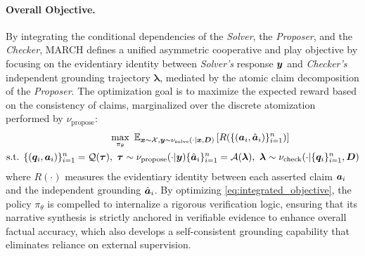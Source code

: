 \documentclass[10pt, a4paper, logo]{googledeepmind} %
\begin{document}
\paragraph{Overall Objective.} By integrating the conditional dependencies of the \textit{Solver},  the \textit{Proposer}, and the \textit{Checker}, MARCH defines a unified {asymmetric cooperative and play objective} by focusing on the {evidentiary identity} between \textit{Solver's} response ${\bm{y}}$ and \textit{Checker's} independent grounding trajectory $\bm{\lambda}$, mediated by the atomic claim decomposition of the \textit{Proposer}. The optimization goal is to maximize the expected reward based on the consistency of claims, marginalized over the discrete atomization performed by $\nu_\text{propose}$:
\begin{align}
   &\max_{\pi_\theta}\ \mathbb{E}_{
   {\bm{x}}\sim{\mathcal{X}}, {\bm{y}} \sim \nu_{\text{solve}} (\cdot|{\bm{x}}, {\bm{D}})} \left[ R(\{({\bm{a}}_i, \hat{{\bm{a}}}_i)\}_{i=1}^n) \right] \label{eq:integrated_objective} \\
\text{s.t. }
   \{({\bm{q}}_i, {\bm{a}}_i)\}_{i=1}^n = {\mathcal{Q}}({\bm{\tau}})&, \ {\bm{\tau}}\sim \nu_{\text{propose}}(\cdot|{\bm{y}}) \{\hat{{\bm{a}}}_i\}_{i=1}^n = {\mathcal{A}}(\bm{\lambda}),   \ \bm{\lambda} \sim \nu_{\text{check}}(\cdot|\{{\bm{q}}_i\}_{i=1}^n, {\bm{D}})  \nonumber
\end{align}   
%
where $R(\cdot)$ measures the evidentiary identity between each asserted claim ${\bm{a}}_i$ and the independent grounding $\hat{{\bm{a}}}_i$. By optimizing \eqref{eq:integrated_objective}, the policy $\pi_\theta$ is compelled to internalize a rigorous verification logic, ensuring that its narrative synthesis is strictly anchored in verifiable evidence to enhance overall factual accuracy, which also develops a self-consistent grounding capability that eliminates reliance on external supervision.
\end{document}
